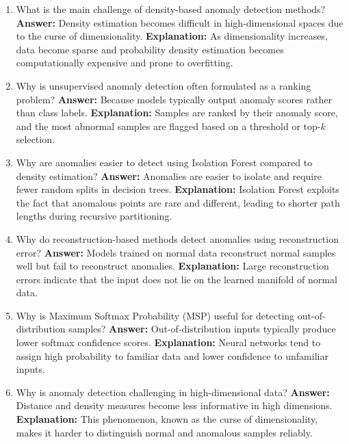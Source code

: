 \documentclass{article}
\begin{document}
\begin{enumerate}
\item What is the main challenge of density-based anomaly detection methods?\newline
\textbf{Answer:} Density estimation becomes difficult in high-dimensional spaces due to the curse of dimensionality.\newline
\textbf{Explanation:} As dimensionality increases, data become sparse and probability density estimation becomes computationally expensive and prone to overfitting.

\item Why is unsupervised anomaly detection often formulated as a ranking problem?\newline
\textbf{Answer:} Because models typically output anomaly scores rather than class labels.\newline
\textbf{Explanation:} Samples are ranked by their anomaly score, and the most abnormal samples are flagged based on a threshold or top-$k$ selection.

\item Why are anomalies easier to detect using Isolation Forest compared to density estimation?\newline
\textbf{Answer:} Anomalies are easier to isolate and require fewer random splits in decision trees.\newline
\textbf{Explanation:} Isolation Forest exploits the fact that anomalous points are rare and different, leading to shorter path lengths during recursive partitioning.

\item Why do reconstruction-based methods detect anomalies using reconstruction error?\newline
\textbf{Answer:} Models trained on normal data reconstruct normal samples well but fail to reconstruct anomalies.\newline
\textbf{Explanation:} Large reconstruction errors indicate that the input does not lie on the learned manifold of normal data.

\item Why is Maximum Softmax Probability (MSP) useful for detecting out-of-distribution samples?\newline
\textbf{Answer:} Out-of-distribution inputs typically produce lower softmax confidence scores.\newline
\textbf{Explanation:} Neural networks tend to assign high probability to familiar data and lower confidence to unfamiliar inputs.

\item Why is anomaly detection challenging in high-dimensional data?\newline
\textbf{Answer:} Distance and density measures become less informative in high dimensions.\newline
\textbf{Explanation:} This phenomenon, known as the curse of dimensionality, makes it harder to distinguish normal and anomalous samples reliably.


\end{enumerate}
\end{document}
